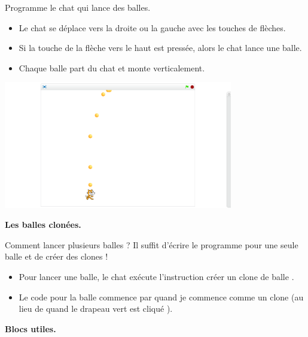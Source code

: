 \documentclass[class=report,crop=false, 12pt]{standalone}
\begin{document}
\begin{activite}

Programme le chat qui lance des balles.
\begin{itemize}
  \item Le chat se déplace vers la droite ou la gauche avec les touches de flèches.
  \item Si la touche de la flèche vers le haut est pressée, alors le chat lance une balle.
  \item Chaque balle part du chat et monte verticalement.
\end{itemize}


\begin{center}
  \includegraphics[width=0.75\textwidth]{ecran-10-ex1} 
\end{center}


\bigskip

\textbf{Les balles clonées.}

Comment lancer plusieurs balles ? Il suffit d'écrire le programme pour une seule balle et de créer des clones !
\begin{itemize}
  \item Pour lancer une balle, le chat exécute l'instruction  \og créer un clone de balle \fg{}.
  \item Le code pour la balle commence par \og quand je commence comme un clone \fg{} (au lieu de \og quand le drapeau vert est cliqué \fg{}).
\end{itemize}

\bigskip

\textbf{Blocs utiles.}

\begin{center}
\begin{scratch}
  \blockspace
\end{scratch}
\end{center} 
  
\end{activite}
\end{document}
